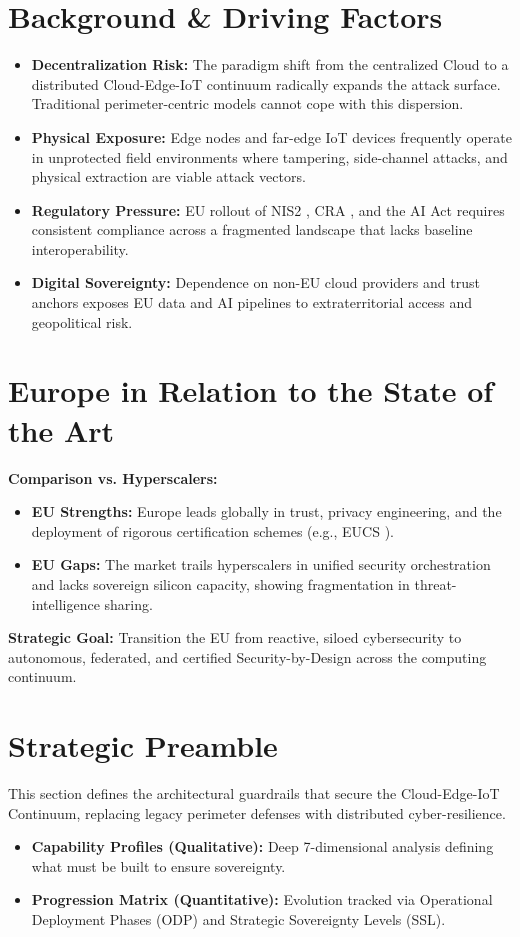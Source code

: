 \documentclass[12pt,a4paper]{article}
\begin{document}
\section{Background \& Driving Factors}
\begin{itemize}
    \item \textbf{Decentralization Risk:} The paradigm shift from the centralized Cloud to a distributed Cloud-Edge-IoT continuum radically expands the attack surface. Traditional perimeter-centric models cannot cope with this dispersion.
    \item \textbf{Physical Exposure:} Edge nodes and far-edge IoT devices frequently operate in unprotected field environments where tampering, side-channel attacks, and physical extraction are viable attack vectors.
    \item \textbf{Regulatory Pressure:} EU rollout of NIS2 \cite{nis2}, CRA \cite{cra}, and the AI Act \cite{aiact} requires consistent compliance across a fragmented landscape that lacks baseline interoperability.
    \item \textbf{Digital Sovereignty:} Dependence on non-EU cloud providers and trust anchors exposes EU data and AI pipelines to extraterritorial access and geopolitical risk.
\end{itemize}

\section{Europe in Relation to the State of the Art}
\textbf{Comparison vs. Hyperscalers:}
\begin{itemize}
    \item \textbf{EU Strengths:} Europe leads globally in trust, privacy engineering, and the deployment of rigorous certification schemes (e.g., EUCS \cite{eucs}). 
    \item \textbf{EU Gaps:} The market trails hyperscalers in unified security orchestration and lacks sovereign silicon capacity, showing fragmentation in threat-intelligence sharing.
\end{itemize}
\textbf{Strategic Goal:} Transition the EU from reactive, siloed cybersecurity to autonomous, federated, and certified Security-by-Design across the computing continuum.

\section{Strategic Preamble}
This section defines the architectural guardrails that secure the Cloud-Edge-IoT Continuum, replacing legacy perimeter defenses with distributed cyber-resilience. 
\begin{itemize}
    \item \textbf{Capability Profiles (Qualitative):} Deep 7-dimensional analysis defining what must be built to ensure sovereignty.
    \item \textbf{Progression Matrix (Quantitative):} Evolution tracked via Operational Deployment Phases (ODP) and Strategic Sovereignty Levels (SSL).
\end{itemize}
\end{document}
